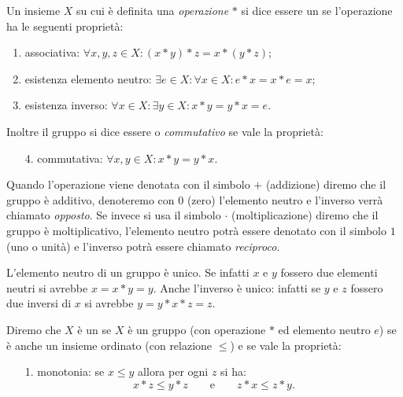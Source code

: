 \begin{definition}[gruppo]
Un insieme $X$ su cui è definita una \emph{operazione} $*$ 
si dice essere un  se l'operazione
ha le seguenti proprietà:
\begin{enumerate}
  \item associativa: $\forall x,y,z\in X\colon (x*y)*z = x*(y*z)$;
  \item esistenza elemento neutro: 
  $\exists e\in X\colon \forall x\in X \colon e*x=x*e = x$;
  \item esistenza inverso: 
  $\forall x\in X\colon \exists y\in X\colon x*y=y*x=e$.
\end{enumerate}
Inoltre il gruppo si dice essere  o \emph{commutativo}
se vale la proprietà:
\begin{enumerate}
  \item[4.] commutativa: $\forall x,y\in X\colon x*y = y*x$.
\end{enumerate}

Quando l'operazione viene denotata con il simbolo $+$ (addizione)
diremo che il gruppo è additivo, denoteremo con $0$ 
%
(zero) l'elemento neutro e l'inverso verrà chiamato \emph{opposto}.
%
Se invece si usa il simbolo $\cdot$ (moltiplicazione)
diremo che il gruppo è moltiplicativo, l'elemento neutro potrà 
essere denotato con il simbolo $1$ (uno o unità) e 
%
l'inverso potrà essere chiamato \emph{reciproco}.
%
\end{definition}

L'elemento neutro di un gruppo è unico. 
Se infatti $x$ e $y$ fossero due elementi neutri 
si avrebbe $x = x*y = y$. 
Anche l'inverso è unico: infatti se $y$ e $z$ fossero 
due inversi di $x$ si avrebbe $y = y * x * z = z$.

\begin{definition}
  Diremo che $X$ è un  se $X$ è un gruppo
  (con operazione $*$ ed elemento neutro $e$) 
  se è anche un insieme ordinato (con relazione $\le$)
  e se vale la proprietà:
  \begin{enumerate}
    \item[1.] monotonia: se $x\le y$ allora per ogni $z$ si ha:
     \[
     x*z \le y*z \qquad\text{e}\qquad z*x \le z*y.
     \] 
  \end{enumerate}
\end{definition}


